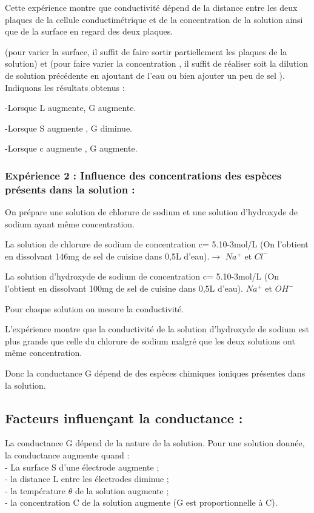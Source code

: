 \documentclass[12pt]{article}
\begin{document}
Cette expérience montre que conductivité dépend de la distance entre les deux plaques de la cellule conductimétrique et
de la concentration de la solution ainsi que de la surface en regard des deux plaques.

(pour varier la surface, il suffit de faire sortir partiellement les plaques de la solution) et (pour faire varier la concentration
, il suffit de réaliser soit la dilution de solution précédente en ajoutant de l’eau ou bien ajouter un peu de sel ).
Indiquons les résultats obtenus :

-Lorsque L augmente, G augmente.

-Lorsque S augmente , G diminue.

-Lorsque c augmente , G augmente.

\subsubsection{Expérience 2 : Influence des concentrations des espèces présents dans la solution :}

On prépare une solution de chlorure de sodium et une solution d’hydroxyde de sodium ayant même concentration.

La solution de chlorure de sodium de concentration c= 5.10-3mol/L (On l’obtient en dissolvant 146mg de sel de cuisine
dans 0,5L d’eau).$\rightarrow$ $Na^+$ et $Cl^-$

La solution d’hydroxyde de sodium de concentration c= 5.10-3mol/L (On l’obtient en dissolvant 100mg de sel de cuisine
dans 0,5L d’eau). $Na^+$ et $OH^-$

Pour chaque solution on mesure la conductivité.

L’expérience montre que la conductivité de la solution d’hydroxyde de sodium est plus grande que celle du chlorure de sodium malgré que les deux solutions ont même concentration.

Donc la conductance G dépend de des espèces chimiques ioniques présentes dans la solution.

\subsection{Facteurs influençant la conductance : }

La conductance G dépend de la nature de la solution. Pour une solution donnée, la conductance augmente quand :
\\- La surface S d’une électrode augmente ;
\\- la distance L entre les électrodes diminue ;
\\- la température $\theta$ de la solution augmente ;
\\- la concentration C de la solution augmente (G est proportionnelle à C).
\end{document}
